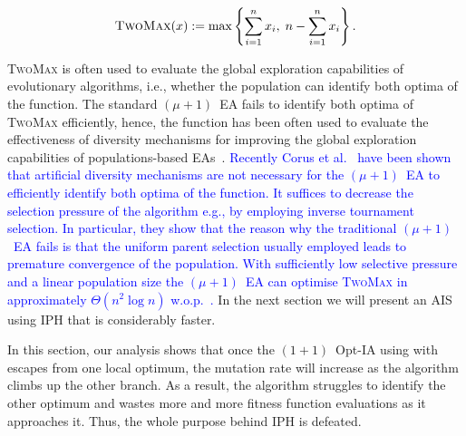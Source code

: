 \documentclass[lettersize,journal]{IEEEtran}
\newcommand{\new}[1]{\textcolor{blue}{#1}}
\begin{document}
 	\begin{equation}\label{func:twomax}
 		\textsc{TwoMax}(x):=\max \left\{\sum_{i=1}^n x_i, \; n-\sum_{i=1}^n x_i \right\}.
 	\end{equation} 
 	
 	\textsc{TwoMax} is often used to evaluate the global exploration capabilities of evolutionary algorithms, i.e., whether the population can identify both optima of the function. The standard $(\mu+1)$~EA fails to identify both optima of \textsc{TwoMax} efficiently, hence, the function has been often used to evaluate the effectiveness of diversity mechanisms for improving the global exploration capabilities of populations-based EAs~\cite{FriedrichOSWECJ09,SudholtBookChapter2019,OlivetoSudholtZarges2018,CovantesOsunaSudholt2017}. \new{Recently Corus et al.~\cite{CorusLissovoiOlivetoWittTELO2021} have been shown that artificial diversity mechanisms are not necessary for the $(\mu+1)$~EA to efficiently identify both optima of the function. It suffices to decrease the selection pressure of the algorithm e.g., by employing  inverse tournament selection. In particular, they show that the reason why the traditional $(\mu+1)$~EA fails is that the uniform parent selection usually employed leads to premature convergence of the population.
 	With sufficiently low selective pressure and a linear population size the $(\mu+1)$~EA can optimise  \textsc{TwoMax} in approximately $\Theta(n^2 \log n)$ w.o.p.~\cite{CorusLissovoiOlivetoWittTELO2021}.} In the next section we will present an AIS using IPH that is considerably faster.
 	
 	In this section, our analysis shows that once the $(1+1)$~Opt-IA using \IPHfcm{} with \expoHD{}  escapes from one local optimum, the mutation rate will increase as the algorithm climbs up the other branch.
 	As a result, the algorithm struggles to identify the other optimum and wastes more and more fitness function evaluations as it approaches it. Thus, the whole purpose behind IPH is defeated.
 	
\end{document}
